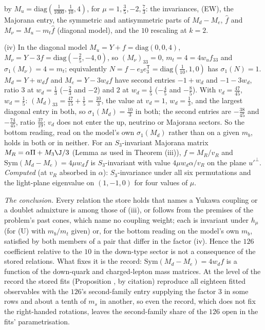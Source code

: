 by $M_{u} = \mathrm{diag}(\tfrac{1}{1000}, \tfrac{1}{10}, 4)$, for $\mu = 1, \tfrac35, -2, \tfrac73$: the invariances, (EW), the Majorana entry, the symmetric and antisymmetric parts of $M_{d} - M_{e}$, $\hat{f}$ and $M_{\nu} = M_{u} - m_{t}\hat{f}$ (diagonal model), and the $10$ rescaling at $k = 2$.

(iv) In the diagonal model $M_{u} = Y + f = \mathrm{diag}(0, 0, 4)$, $M_{\nu} = Y - 3f = \mathrm{diag}(-\tfrac25, -4, 0)$, so $(M_{\nu})_{33} = 0$, $m_{t} = 4 = 4w_{u}f_{33}$ and $\sigma_{1}(M_{\nu}) = 4 = m_{t}$; equivalently $N = \hat{f} - e_{3}e_{3}^{\mathsf{T}} = \mathrm{diag}(\tfrac{1}{10}, 1, 0)$ has $\sigma_{1}(N) = 1$. $M_{d} = Y + w_{d}f$ and $M_{e} = Y - 3w_{d}f$ have second entries $-1 + w_{d}$ and $-1 - 3w_{d}$, ratio $3$ at $w_{d} = \tfrac13$ ($-\tfrac23$ and $-2$) and $2$ at $w_{d} = \tfrac15$ ($-\tfrac45$ and $-\tfrac85$). With $v_{d} = \tfrac{47}{45}$, $w_{d} = \tfrac15$: $(M_{d})_{33} = \tfrac{47}{15} + \tfrac15 = \tfrac{10}{3}$, the value at $v_{d} = 1$, $w_{d} = \tfrac13$, and the largest diagonal entry in both, so $\sigma_{1}(M_{d}) = \tfrac{10}{3}$ in both; the second entries are $-\tfrac{38}{45}$ and $-\tfrac{74}{45}$, ratio $\tfrac{37}{19}$; $v_{d}$ does not enter the up, neutrino or Majorana sectors. So the bottom reading, read on the model's own $\sigma_{1}(M_{d})$ rather than on a given $m_{b}$, holds in both or in neither. For an $S_{3}$-invariant Majorana matrix $M_{R} = \alpha\Pi + M_{3}\J/3$ (Lemma  as used in Theorem (iii)), $f = M_{R}/v_{R}$ and $\mathrm{Sym}(M_{d} - M_{e}) = 4\mu w_{d}f$ is $S_{3}$-invariant with value $4\mu w_{d}\alpha/v_{R}$ on the plane $u'^{\perp}$. \emph{Computed} (at $v_{R}$ absorbed in $\alpha$): $S_{3}$-invariance under all six permutations and the light-plane eigenvalue on $(1, -1, 0)$ for four values of $\mu$.

\emph{The conclusion.} Every relation the store holds that names a Yukawa coupling or a doublet admixture is among those of (iii), or follows from the premises of the problem's past cones, which name no coupling weight; each is invariant under $h_{\mu}$ (for (U) with $m_{b}/m_{t}$ given) or, for the bottom reading on the model's own $m_{b}$, satisfied by both members of a pair that differ in the factor (iv). Hence the $126$ coefficient relative to the $10$ in the down-type sector is not a consequence of the stored relations. What fixes it is the record: $\mathrm{Sym}(M_{d} - M_{e}) = 4w_{d}f$ is a function of the down-quark and charged-lepton mass matrices. At the level of the record the stored fits (Proposition , by citation) reproduce all eighteen fitted observables with the $126$'s second-family entry supplying the factor $3$ in some rows and about a tenth of $m_{s}$ in another, so even the record, which does not fix the right-handed rotations, leaves the second-family share of the $126$ open in the fits' parametrisation.


